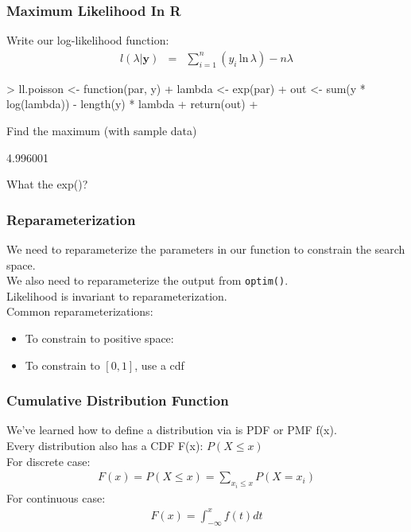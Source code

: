 \documentclass{beamer}
\begin{document}
\begin{frame}[fragile]
\frametitle{Maximum Likelihood In R}
\pause
Write our log-likelihood function:
\pause
\begin{eqnarray*}
l(\lambda | \mathbf{y}) &=& \sum_{i=1}^n (y_i \, \mathrm{ln} \, \lambda)
- n\lambda 
\end{eqnarray*}
\pause
\tiny
\begin{Schunk}
\begin{Sinput}
> ll.poisson <- function(par, y) {
+     lambda <- exp(par)
+     out <- sum(y * log(lambda)) - length(y) * lambda
+     return(out)
+ }
\end{Sinput}
\end{Schunk}
\pause
\normalsize
\bigskip
Find the maximum (with sample data) 
\tiny
\begin{Schunk}
\begin{Soutput}
[1] 4.996001
\end{Soutput}
\end{Schunk}
\normalsize
\pause
What the exp()?
\end{frame}

\begin{frame}
\frametitle{Reparameterization}
\pause
We need to reparameterize the parameters in our function to constrain
the search space. \\
\pause
\bigskip
We also need to reparameterize the output from {\tt optim()}. \\
\bigskip
\pause
Likelihood is invariant to reparameterization. \\
\bigskip
\pause
Common reparameterizations:
\pause
\begin{itemize}
\item To constrain to positive space: 
\pause
\item To constrain to $[0,1]$, \pause use a cdf
\end{itemize}
\end{frame}

\begin{frame}
\frametitle{Cumulative Distribution Function}
\pause
We've learned how to define a distribution via is PDF or PMF f(x). \\
\pause
\bigskip
Every distribution also has a CDF F(x): \pause $P(X \le x)$\\
\pause
\bigskip
For discrete case:
\begin{eqnarray*}
F(x) = P(X \le x) = \sum_{x_i \le x} P(X = x_i)
\end{eqnarray*}
\pause
For continuous case:
\begin{eqnarray*}
F(x) = \int_{-\infty}^x f(t) dt
\end{eqnarray*}
\end{frame}
\end{document}
